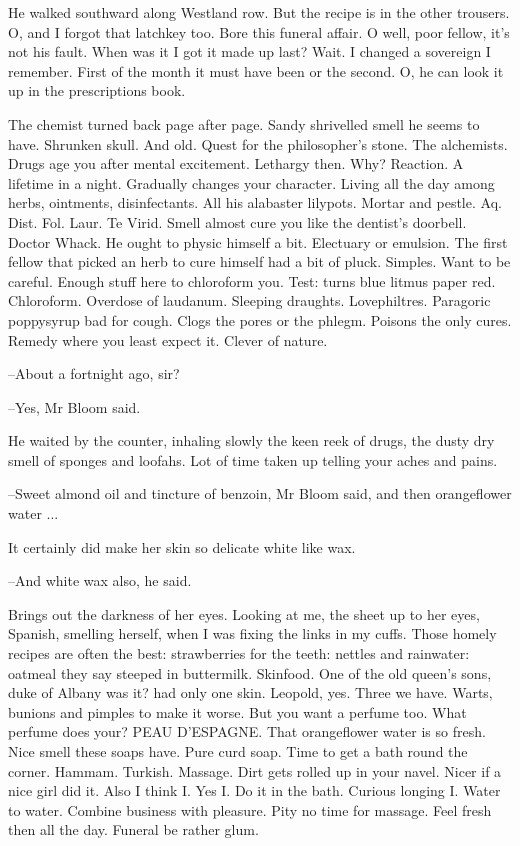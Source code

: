 He walked southward along Westland row. But the recipe is in the
other trousers. O, and I forgot that latchkey too. Bore this funeral
affair. O well, poor fellow, it's not his fault. When was it I got it made
up last? Wait. I changed a sovereign I remember. First of the month it
must have been or the second. O, he can look it up in the prescriptions
book.

The chemist turned back page after page. Sandy shrivelled smell he
seems to have. Shrunken skull. And old. Quest for the philosopher's stone.
The alchemists. Drugs age you after mental excitement. Lethargy then.
Why? Reaction. A lifetime in a night. Gradually changes your character.
Living all the day among herbs, ointments, disinfectants. All his
alabaster lilypots. Mortar and pestle. Aq. Dist. Fol. Laur. Te Virid.
Smell almost cure you like the dentist's doorbell. Doctor Whack. He ought
to physic himself a bit. Electuary or emulsion. The first fellow that
picked an herb to cure himself had a bit of pluck. Simples. Want to be
careful. Enough stuff here to chloroform you. Test: turns blue litmus
paper red. Chloroform. Overdose of laudanum. Sleeping draughts.
Lovephiltres. Paragoric poppysyrup bad for cough. Clogs the pores or the
phlegm. Poisons the only cures. Remedy where you least expect it. Clever
of nature.

--About a fortnight ago, sir?

--Yes, Mr Bloom said.

He waited by the counter, inhaling slowly the keen reek of drugs, the
dusty dry smell of sponges and loofahs. Lot of time taken up telling your
aches and pains.

--Sweet almond oil and tincture of benzoin, Mr Bloom said, and then
orangeflower water ...

It certainly did make her skin so delicate white like wax.

--And white wax also, he said.

Brings out the darkness of her eyes. Looking at me, the sheet up to
her eyes, Spanish, smelling herself, when I was fixing the links in my
cuffs. Those homely recipes are often the best: strawberries for the
teeth: nettles and rainwater: oatmeal they say steeped in buttermilk.
Skinfood. One of the old queen's sons, duke of Albany was it? had only one
skin. Leopold, yes. Three we have. Warts, bunions and pimples to make it
worse. But you want a perfume too. What perfume does your? PEAU D'ESPAGNE.
That orangeflower water is so fresh. Nice smell these soaps have. Pure
curd soap. Time to get a bath round the corner. Hammam. Turkish. Massage.
Dirt gets rolled up in your navel. Nicer if a nice girl did it. Also I
think I. Yes I. Do it in the bath. Curious longing I. Water to water.
Combine business with pleasure. Pity no time for massage. Feel fresh then
all the day. Funeral be rather glum.

